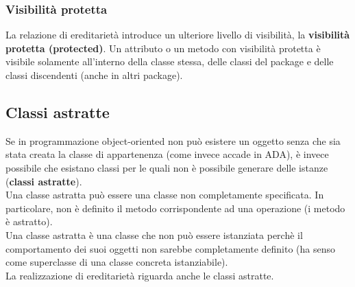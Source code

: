 \documentclass{article}
\begin{document}
	\subsubsection{Visibilità protetta}
	La relazione di ereditarietà introduce un ulteriore livello di visibilità, la \textbf{visibilità protetta (protected)}. Un attributo o un metodo con visibilità protetta è visibile solamente all'interno della classe stessa, delle classi del package e delle classi discendenti (anche in altri package).

	\subsection{Classi astratte}
	Se in programmazione object-oriented non può esistere un oggetto senza che sia stata creata la classe di appartenenza (come invece accade in ADA), è invece possibile che esistano classi per le quali non è possibile generare delle istanze (\textbf{classi astratte}). \\
	Una classe astratta può essere una classe non completamente specificata. In particolare, non è definito il metodo corrispondente ad una operazione (i metodo è astratto). \\
	Una classe astratta è una classe che non può essere istanziata perchè il comportamento dei suoi oggetti non sarebbe completamente definito (ha senso come superclasse di una classe concreta istanziabile). \\
	La realizzazione di ereditarietà riguarda anche le classi astratte.
\end{document}
